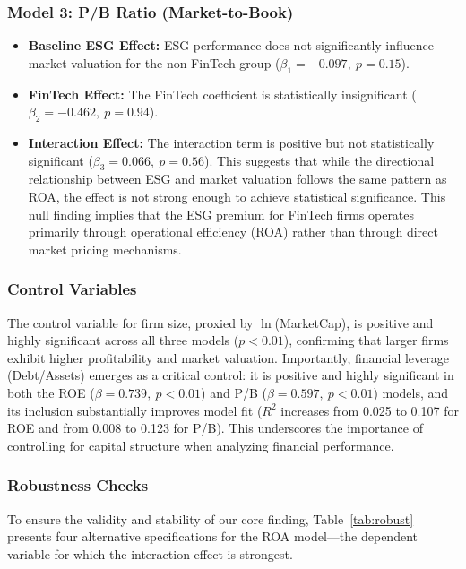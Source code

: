 \documentclass[12pt]{article}
\begin{document}
\subsubsection{Model 3: P/B Ratio (Market-to-Book)}
\begin{itemize}
    \item \textbf{Baseline ESG Effect:} ESG performance does not significantly influence market valuation for the non-FinTech group ($\beta_1 = -0.097,\ p = 0.15$).
    \item \textbf{FinTech Effect:} The FinTech coefficient is statistically insignificant ($\beta_2 = -0.462,\ p = 0.94$).
    \item \textbf{Interaction Effect:} The interaction term is positive but not statistically significant ($\beta_3 = 0.066,\ p = 0.56$). This suggests that while the directional relationship between ESG and market valuation follows the same pattern as ROA, the effect is not strong enough to achieve statistical significance. This null finding implies that the ESG premium for FinTech firms operates primarily through operational efficiency (ROA) rather than through direct market pricing mechanisms.
\end{itemize}

\subsubsection{Control Variables}
The control variable for firm size, proxied by $\ln$(MarketCap), is positive and highly significant across all three models ($p < 0.01$), confirming that larger firms exhibit higher profitability and market valuation. Importantly, financial leverage (Debt/Assets) emerges as a critical control: it is positive and highly significant in both the ROE ($\beta = 0.739,\ p < 0.01$) and P/B ($\beta = 0.597,\ p < 0.01$) models, and its inclusion substantially improves model fit ($R^2$ increases from 0.025 to 0.107 for ROE and from 0.008 to 0.123 for P/B). This underscores the importance of controlling for capital structure when analyzing financial performance.

\subsubsection{Robustness Checks}
To ensure the validity and stability of our core finding, Table~\ref{tab:robust} presents four alternative specifications for the ROA model---the dependent variable for which the interaction effect is strongest.
\end{document}
